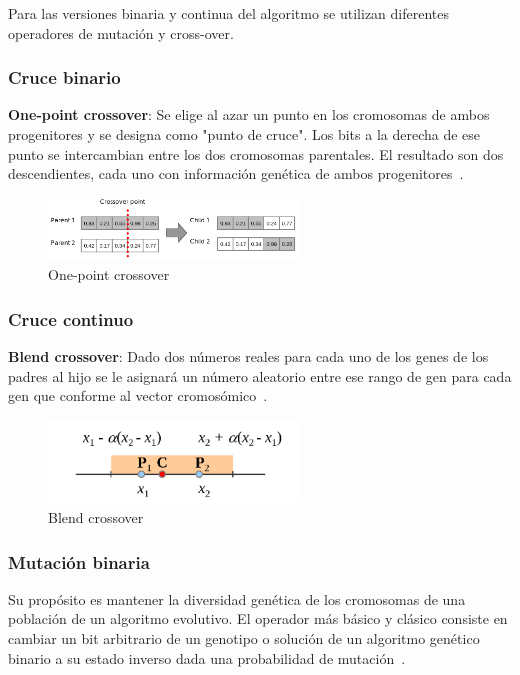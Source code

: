 Para las versiones binaria y continua del algoritmo se utilizan diferentes operadores de mutación y cross-over.

\subsubsection{Cruce binario}
\textbf{One-point crossover}: Se elige al azar un punto en los cromosomas de ambos progenitores y se designa como "punto de cruce". Los bits a la derecha de ese punto se intercambian entre los dos cromosomas parentales. El resultado son dos descendientes, cada uno con información genética de ambos progenitores~\cite{DAGDIA2020283}.
\begin{figure}[H]
    \begin{center}
        \includegraphics[width=0.6\textwidth]{imagenes/one-point-crossover.png}
    \end{center}
    \caption[One point crossover]{One-point crossover~\cite{purduelecture}}
\end{figure}

\subsubsection{Cruce continuo}
\textbf{Blend crossover}: Dado dos números reales para cada uno de los genes de los padres al hijo se le asignará un número aleatorio entre ese rango de gen para cada gen que conforme al vector cromosómico~\cite{purduelecture}.
\begin{figure}[H]
    \begin{center}
        \includegraphics[width=0.6\textwidth]{imagenes/blend-crossover.png}
    \end{center}
    \caption[Blend crossover]{Blend crossover~\cite{purduelecture}}
\end{figure}

\subsubsection{Mutación binaria}
Su propósito es mantener la diversidad genética de los cromosomas de una población de un algoritmo evolutivo.
El operador más básico y clásico consiste en cambiar un bit arbitrario de un genotipo o solución de un algoritmo genético binario a su estado inverso dada una probabilidad de mutación~\cite{mirjalili2019genetic}.

